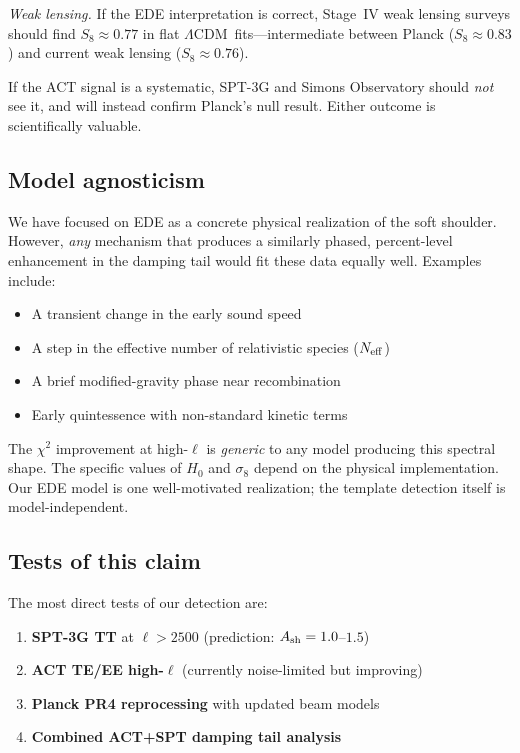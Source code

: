 \documentclass[twocolumn,showpacs,preprintnumbers,amsmath,amssymb,prd]{revtex4-2}
\newcommand{\lcdm}{$\Lambda$CDM}
\begin{document}
\emph{Weak lensing.} If the EDE interpretation is correct, Stage~IV weak 
lensing surveys should find $S_8 \approx 0.77$ in flat \lcdm\ fits---intermediate 
between Planck ($S_8 \approx 0.83$) and current weak lensing ($S_8 \approx 0.76$).

If the ACT signal is a systematic, SPT-3G and Simons Observatory should 
\emph{not} see it, and will instead confirm Planck's null result. Either 
outcome is scientifically valuable.

\subsection{Model agnosticism}
\label{sec:agnostic}

We have focused on EDE as a concrete physical realization of the soft 
shoulder. However, \emph{any} mechanism that produces a similarly phased, 
percent-level enhancement in the damping tail would fit these data 
equally well. Examples include:
\begin{itemize}
\item A transient change in the early sound speed
\item A step in the effective number of relativistic species ($N_{\rm eff}$)
\item A brief modified-gravity phase near recombination
\item Early quintessence with non-standard kinetic terms
\end{itemize}

The $\chi^2$ improvement at high-$\ell$ is \emph{generic} to any model 
producing this spectral shape. The specific values of $H_0$ and $\sigma_8$ 
depend on the physical implementation. Our EDE model is one well-motivated 
realization; the template detection itself is model-independent.

\subsection{Tests of this claim}
\label{sec:tests}

The most direct tests of our detection are:
\begin{enumerate}
\item \textbf{SPT-3G TT} at $\ell > 2500$ (prediction: $A_{\rm sh} = 1.0$--$1.5$)
\item \textbf{ACT TE/EE high-$\ell$} (currently noise-limited but improving)
\item \textbf{Planck PR4 reprocessing} with updated beam models
\item \textbf{Combined ACT+SPT damping tail analysis}
\end{enumerate}
\end{document}
